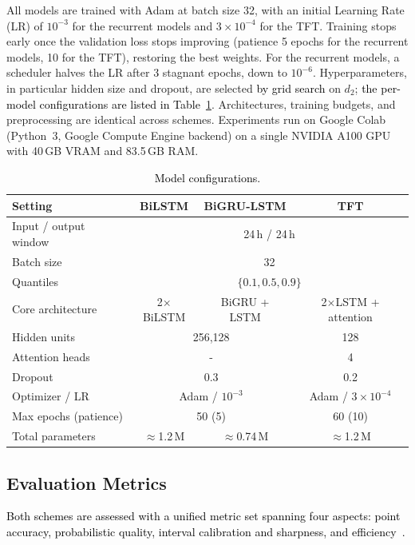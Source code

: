\documentclass[final,10pt,1p,authoryear]{elsarticle}
\theoremstyle{definition}
\begin{document}
All models are trained with Adam at batch size 32, with an initial Learning Rate (LR) of $10^{-3}$ for the recurrent models and $3\times10^{-4}$ for the TFT. Training stops early once the validation loss stops improving (patience 5 epochs for the recurrent models, 10 for the TFT), restoring the best weights. For the recurrent models, a scheduler halves the LR after 3 stagnant epochs, down to $10^{-6}$. Hyperparameters, in particular hidden size and dropout, are selected \textcolor{black}{by grid search} on $d_2$; \textcolor{black}{the per-model configurations are listed in Table~\ref{tab:tfthp}}. Architectures, training budgets, and preprocessing are identical across schemes. Experiments run on Google Colab (Python~3, Google Compute Engine backend) on a single NVIDIA A100 GPU with 40\,GB VRAM and 83.5\,GB RAM.
\begin{table}[!htbp]
\centering
\caption{\textcolor{black}{Model configurations.}}\label{tab:tfthp}
\begin{tabular}{lccc}\toprule
Setting & BiLSTM & BiGRU-LSTM & TFT \\\midrule
Input / output window & \multicolumn{3}{c}{24\,h / 24\,h} \\
Batch size & \multicolumn{3}{c}{32} \\
Quantiles & \multicolumn{3}{c}{$\{0.1,0.5,0.9\}$} \\
\midrule
Core architecture & 2$\times$BiLSTM & BiGRU + LSTM & 2$\times$LSTM + attention \\
Hidden units & \multicolumn{2}{c}{256,128} & 128 \\
Attention heads & \multicolumn{2}{c}{-} & 4 \\
Dropout & \multicolumn{2}{c}{0.3} & 0.2 \\
Optimizer / LR & \multicolumn{2}{c}{Adam / $10^{-3}$} & Adam / $3\times10^{-4}$ \\
Max epochs (patience) & \multicolumn{2}{c}{50 (5)} & 60 (10) \\
Total parameters & $\approx$1.2\,M & $\approx$0.74\,M & $\approx$1.2\,M\\\bottomrule
\end{tabular}
\end{table}
\subsection{Evaluation Metrics}
\textcolor{black}{Both schemes are assessed with a unified metric set spanning four aspects: point accuracy, probabilistic quality, interval calibration and sharpness, and efficiency~\citet{sarah2025lightweight}.}
\end{document}
